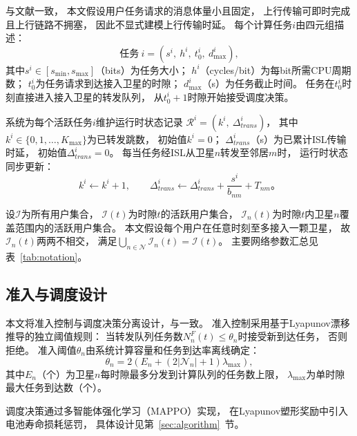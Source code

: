 \documentclass[a4paper,11pt]{article}
\begin{document}
与文献\cite{zhang2024mhspo}一致，
本文假设用户任务请求的消息体量小且固定，
上行传输可即时完成且上行链路不拥塞，
因此不显式建模上行传输时延。
每个计算任务$i$由四元组描述：
\begin{equation}
    \text{任务}~i = (s^i,~h^i,~t^i_0,~d^i_{\max}),
    \label{eq:task_tuple}
\end{equation}
其中$s^i \in [s_{\min}, s_{\max}]$（bits）为任务大小；
$h^i$（cycles/bit）为每bit所需CPU周期数；
$t^i_0$为任务请求到达接入卫星的时隙；
$d^i_{\max}$（s）为任务截止时间。
任务在$t^i_0$时刻直接进入接入卫星的转发队列，
从$t^i_0 + 1$时隙开始接受调度决策。

系统为每个活跃任务$i$维护运行时状态记录
$\mathcal{R}^i = (k^i,~\Delta^i_{trans})$，
其中$k^i \in \{0,1,\ldots,K_{\max}\}$为已转发跳数，
初始值$k^i=0$；
$\Delta^i_{trans}$（s）为已累计ISL传输时延，
初始值$\Delta^i_{trans}=0$。
每当任务经ISL从卫星$n$转发至邻居$m$时，
运行时状态同步更新：
\begin{equation}
    k^i \leftarrow k^i + 1,\qquad
    \Delta^i_{trans} \leftarrow \Delta^i_{trans}
    + \frac{s^i}{b_{nm}} + T_{nm}。
    \label{eq:runtime_update}
\end{equation}

设$\mathcal{I}$为所有用户集合，
$\mathcal{I}(t)$为时隙$t$的活跃用户集合，
$\mathcal{I}_n(t)$为时隙$t$内卫星$n$覆盖范围内的活跃用户集合。
本文假设每个用户在任意时刻至多接入一颗卫星，
故$\mathcal{I}_n(t)$两两不相交，
满足$\bigcup_{n \in \mathcal{N}} \mathcal{I}_n(t) = \mathcal{I}(t)$。
主要网络参数汇总见表~\ref{tab:notation}。

\subsection{准入与调度设计}

本文将准入控制与调度决策分离设计，与\cite{zhang2024mhspo}一致。
准入控制采用基于Lyapunov漂移推导的独立阈值规则：
当转发队列任务数$N^F_n(t) \leq \theta_n$时接受新到达任务，
否则拒绝。
准入阈值$\theta_n$由系统计算容量和任务到达率离线确定：
\begin{equation}
    \theta_n = 2\left(E_n
    + (2|\mathcal{N}_n|+1)\lambda_{\max}\right),
    \label{eq:theta}
\end{equation}
其中$E_n$（个）为卫星$n$每时隙最多分发到计算队列的任务数上限，
$\lambda_{\max}$为单时隙最大任务到达数（个）。

调度决策通过多智能体强化学习（MAPPO）实现，
在Lyapunov塑形奖励中引入电池寿命损耗惩罚，
具体设计见第~\ref{sec:algorithm}~节。
\end{document}

